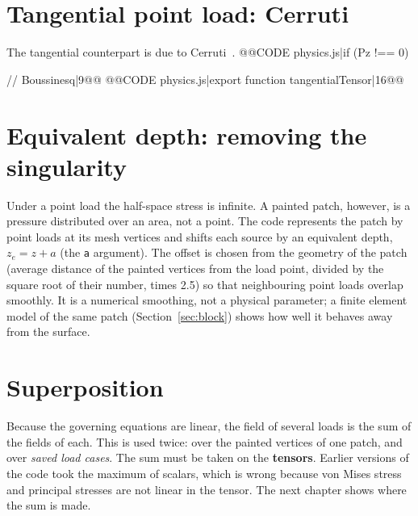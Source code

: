 \section{Tangential point load: Cerruti}
The tangential counterpart is due to Cerruti~\cite{cerruti}.
@@CODE physics.js|if (Pz !== 0) { // Boussinesq|9@@
@@CODE physics.js|export function tangentialTensor|16@@

\section{Equivalent depth: removing the singularity}
Under a point load the half-space stress is infinite. A painted patch, however, is a pressure distributed over an area, not a point. The code represents the patch by point loads at its mesh vertices and shifts each source by an equivalent depth, $z_e=z+a$ (the \texttt{a} argument). The offset is chosen from the geometry of the patch (average distance of the painted vertices from the load point, divided by the square root of their number, times 2.5) so that neighbouring point loads overlap smoothly. It is a numerical smoothing, not a physical parameter; a finite element model of the same patch (Section~\ref{sec:block}) shows how well it behaves away from the surface.

\section{Superposition}
Because the governing equations are linear, the field of several loads is the sum of the fields of each. This is used twice: over the painted vertices of one patch, and over \emph{saved load cases}. The sum must be taken on the \textbf{tensors}. Earlier versions of the code took the maximum of scalars, which is wrong because von Mises stress and principal stresses are not linear in the tensor. The next chapter shows where the sum is made.

}

